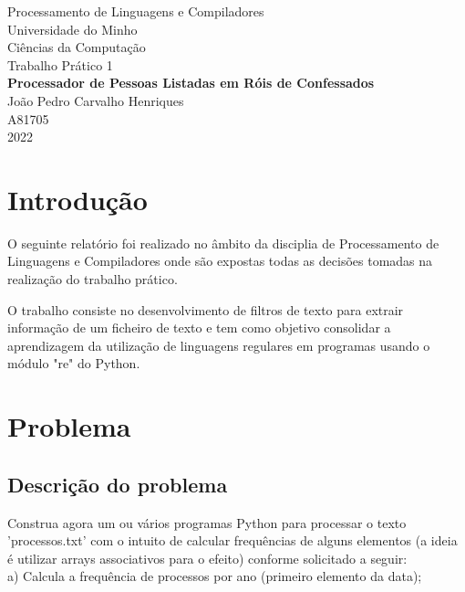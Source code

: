 \documentclass[a4paper, 12pt]{article}
\begin{document}
\begin{titlepage}
	\begin{center}
		\Huge{Processamento de Linguagens e Compiladores}\\
		\large{Universidade do Minho}\\
		\large{Ciências da Computação}\\ 
		\large{Trabalho Prático 1}\\ 
		\vspace{15pt}
        \vspace{95pt}
        \textbf{\LARGE{Processador de Pessoas Listadas em Róis de Confessados}}\\
		\vspace{3,5cm}
		\large{João Pedro Carvalho Henriques}\\
		\large{A81705}\\
		\vspace{3 cm}
		\large{2022}
	\end{center}	
\end{titlepage}

\tableofcontents

\newpage
\section{Introdução}\label{sec:intro}
O seguinte relatório foi realizado no âmbito da disciplia de Processamento de Linguagens e Compiladores onde são expostas todas as decisões tomadas na realização do trabalho prático.

O trabalho consiste no desenvolvimento de filtros de texto para extrair informação de um ficheiro de texto e tem como objetivo consolidar a aprendizagem da utilização de linguagens regulares em programas usando o módulo "re" do Python.

\newpage
\section{Problema}

\subsection{Descrição do problema}
Construa agora um ou vários programas Python para processar o texto 'processos.txt' com o intuito de calcular frequências de alguns elementos (a ideia é utilizar arrays associativos para o efeito) conforme solicitado a seguir:\\

a) Calcula a frequência de processos por ano (primeiro elemento da data);\\
\end{document}
